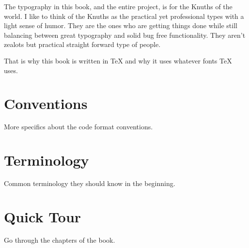 The typography in this book, and the entire project, is for the Knuths of the world.  I like to think
of the Knuths as the practical yet professional types with a light sense of humor.  They are the ones
who are getting things done while still balancing between great typography and solid bug free functionality.
They aren't zealots but practical straight forward type of people.

That is why this book is written in TeX and why it uses whatever fonts TeX uses.

\section*{Conventions}

More specifics about the code format conventions.

\section*{Terminology}

Common terminology they should know in the beginning.

\section*{Quick Tour}

Go through the chapters of the book.

